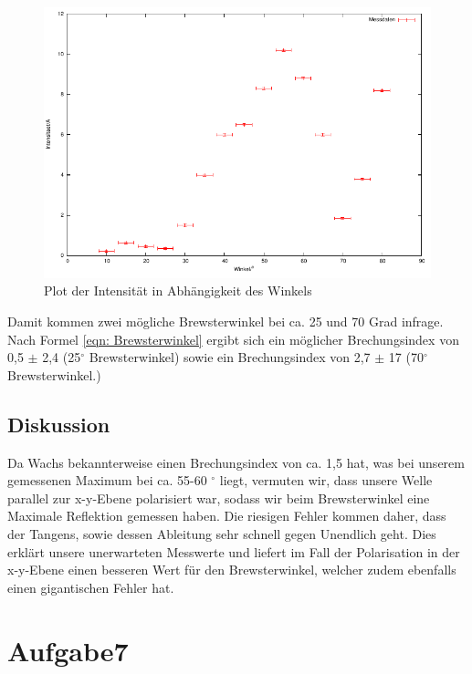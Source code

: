 \documentclass[12pt]{scrartcl}
\begin{document}
\begin{figure}[H]
\centering
    \includegraphics[scale = 1]{a_6.pdf}
  	\caption[Plot der Intensität in Abhängigkeit des Winkels]{Plot der Intensität in Abhängigkeit des Winkels}
  \label{fig:a_6}
\end{figure}
Damit kommen zwei mögliche Brewsterwinkel bei ca. 25 und 70 Grad infrage.
Nach Formel \ref{eqn: Brewsterwinkel} ergibt sich ein möglicher Brechungsindex von 0,5 $\pm$ 2,4 (25$^{\circ}$ Brewsterwinkel) sowie ein Brechungsindex von 2,7 $\pm$ 17 (70$^{\circ}$ Brewsterwinkel.) 
\subsection{Diskussion}
Da Wachs bekannterweise einen Brechungsindex von ca. 1,5 hat, was bei unserem gemessenen Maximum bei ca. 55-60 $^{\circ}$ liegt, vermuten wir, dass unsere Welle parallel zur x-y-Ebene polarisiert war, sodass wir beim Brewsterwinkel eine Maximale Reflektion gemessen haben. Die riesigen Fehler kommen daher, dass der Tangens, sowie dessen Ableitung sehr schnell gegen Unendlich geht. Dies erklärt unsere unerwarteten Messwerte und liefert im Fall der Polarisation in der x-y-Ebene einen besseren Wert für den Brewsterwinkel, welcher zudem ebenfalls einen gigantischen Fehler hat.
\section{Aufgabe7}
\end{document}
